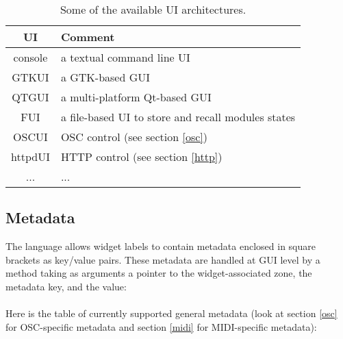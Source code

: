 \begin{table}[htp]
\begin{center}
\begin{tabular}{|c|l|}
\hline
\bf{UI} & \bf{Comment} \\
\hline
console & a textual command line UI \\
GTKUI & a GTK-based GUI \\
QTGUI & a multi-platform Qt-based GUI \\
FUI & a file-based UI to store and recall modules states \\
OSCUI & OSC control (see section \ref{osc}) \\
httpdUI & HTTP control (see section \ref{http}) \\
...  & ... \\
\hline
\end{tabular}
\end{center}
\caption{Some of the available UI architectures.}
\label{tab:uiarch}
\end{table}%

\subsection{Metadata}
\label{metadata}
The \faust language allows widget labels to contain metadata enclosed in square brackets as key/value pairs. These metadata are handled at GUI level by a  method taking as arguments a pointer to the widget-associated zone, the metadata key, and the value: \\
\htab{} \\

Here is the table of currently supported general metadata (look at section \ref{osc} for OSC-specific metadata and section \ref{midi} for MIDI-specific metadata):

